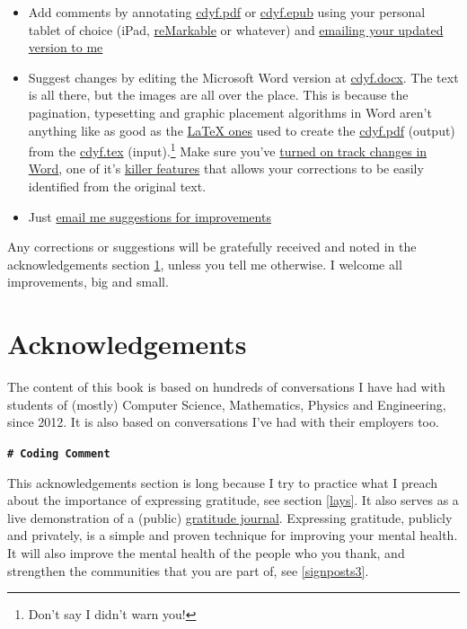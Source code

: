\documentclass[
]{book}
\providecommand{\tightlist}{%
  \setlength{\itemsep}{0pt}\setlength{\parskip}{0pt}}
\begin{document}
\begin{itemize}
\tightlist
\item
  Add comments by annotating \href{cdyf.me/cdyf.pdf}{cdyf.pdf} or \href{https://cdyf.me/cdyf.epub}{cdyf.epub} using your personal tablet of choice (iPad, \href{https://en.wikipedia.org/wiki/ReMarkable}{reMarkable} or whatever) and \href{https://personalpages.manchester.ac.uk/staff/duncan.hull/contact.html}{emailing your updated version to me}
\item
  Suggest changes by editing the Microsoft Word version at \href{http://cdyf.me/cdyf.docx}{cdyf.docx}. The text is all there, but the images are all over the place. This is because the pagination, typesetting and graphic placement algorithms in Word aren't anything like as good as the \href{https://latex4year1.netlify.app/}{LaTeX ones} used to create the \href{https://leanpub.com/cdyf}{cdyf.pdf} (output) from the \href{https://github.com/dullhunk/cdyf/blob/master/_book/cdyf.tex}{cdyf.tex} (input).\footnote{Don't say I didn't warn you!} Make sure you've \href{https://support.microsoft.com/en-us/office/track-changes-in-word-197ba630-0f5f-4a8e-9a77-3712475e806a}{turned on track changes in Word}, one of it's \href{https://en.wikipedia.org/wiki/Killer_feature}{killer features} that allows your corrections to be easily identified from the original text.
\item
  Just \href{https://personalpages.manchester.ac.uk/staff/duncan.hull/contact.html}{email me suggestions for improvements}
\end{itemize}

Any corrections or suggestions will be gratefully received and noted in the acknowledgements section \ref{thanks}, unless you tell me otherwise. I welcome all improvements, big and small.

\hypertarget{thanks}{%
\section{Acknowledgements}\label{thanks}}

The content of this book is based on hundreds of conversations I have had with students of (mostly) Computer Science, Mathematics, Physics and Engineering, since 2012. It is also based on conversations I've had with their employers too.

\textbf{\texttt{\#\ Coding\ Comment}}

This acknowledgements section is long because I try to practice what I preach about the importance of expressing gratitude, see section \ref{lays}. It also serves as a live demonstration of a (public) \href{https://en.wikipedia.org/wiki/Gratitude_journal}{gratitude journal}. Expressing gratitude, publicly and privately, is a simple and proven technique for improving your mental health. It will also improve the mental health of the people who you thank, and strengthen the communities that you are part of, see \ref{signposts3}.
\end{document}
